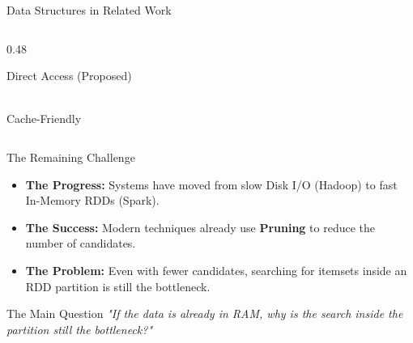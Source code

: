 \begin{frame}[t]{Data Structures in Related Work}
\begin{columns}[T]
\begin{column}{0.48\textwidth}
\begin{alertblock}{Direct Access (Proposed)}
\\
                Cache-Friendly
            \end{alertblock}
        \end{column}
    \end{columns}
\end{frame}

\begin{frame}[t]{The Remaining Challenge}
    \begin{itemize}
        \item \textbf{The Progress:} Systems have moved from slow Disk I/O (Hadoop) to fast In-Memory RDDs (Spark).
        \item \textbf{The Success:} Modern techniques already use \textbf{Pruning} to reduce the number of candidates.
        \item \textbf{The Problem:} Even with fewer candidates, searching for itemsets inside an RDD partition is still the bottleneck.
    \end{itemize}

    \vspace{1.0cm}
    \begin{alertblock}{The Main Question}
        \centering
        \large \textit{"If the data is already in RAM, why is the search inside the partition still the bottleneck?"}
    \end{alertblock}
\end{frame}
